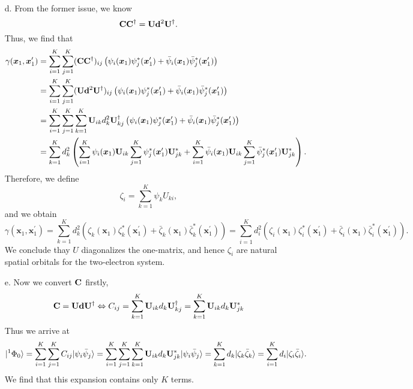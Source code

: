 \documentclass[a4paper]{book}
\newcommand{\C}{{\bf C}}
\newcommand{\U}{{\bf U}}
\begin{document}
\begin{solution}
\begin{enumerate}
	\item[d.] From the former issue, we know
	\[
		\C \C^\dagger = \U {\bf d}^2 \U^\dagger.
	\]
	Thus, we find that
	\begin{align*}
		\gamma( \boldsymbol{x}_1 , \boldsymbol{x}^\prime_1 ) &= \sum_{ i=1 }^K \sum_{ j=1 }^K (\C \C^\dagger)_{ij} \left( \psi_i( \boldsymbol{x}_1 ) \psi^*_j( \boldsymbol{x}^\prime_1 ) + \bar{\psi}_i( \boldsymbol{x}_1 ) \bar{\psi}^*_j( \boldsymbol{x}^\prime_1 ) \right) \\
		&= \sum_{ i=1 }^K \sum_{ j=1 }^K ( \U {\bf d}^2 \U^\dagger )_{ij} \left( \psi_i( \boldsymbol{x}_1 ) \psi^*_j( \boldsymbol{x}^\prime_1 ) + \bar{\psi}_i( \boldsymbol{x}_1 ) \bar{\psi}^*_j( \boldsymbol{x}^\prime_1 ) \right) \\
		&= \sum_{ i=1 }^K \sum_{ j=1 }^K \sum_{ k=1 }^K \U_{ik} d^2_k \U^\dagger_{kj} \left( \psi_i( \boldsymbol{x}_1 ) \psi^*_j( \boldsymbol{x}^\prime_1 ) + \bar{\psi}_i( \boldsymbol{x}_1 ) \bar{\psi}^*_j( \boldsymbol{x}^\prime_1 ) \right) \\
		&= \sum_{ k=1 }^K d^2_k \left( \sum_{ i=1 }^K \psi_i( \boldsymbol{x}_1 ) \U_{ik} \sum_{ j=1 }^K \psi^*_j( \boldsymbol{x}^\prime_1 ) \U^*_{jk} + \sum_{ i=1 }^K \bar{\psi}_i( \boldsymbol{x}_1 ) \U_{ik} \sum_{ j=1 }^K \bar{\psi}^*_j( \boldsymbol{x}^\prime_1 ) \U^*_{jk} \right).
	\end{align*}
	Therefore, we define
	\[
		\zeta_i = \sum_{k=1}^K \psi_k U_{ki},
	\]
	and we obtain
	\begin{equation}
		\gamma( \boldsymbol{x}_1 , \boldsymbol{x}^\prime_1 ) = \sum_{ k=1 }^K d^2_k \left( \zeta_k(\boldsymbol{x}_1) \zeta^*_k( \boldsymbol{x}^\prime_1 ) + \bar{\zeta}_k( \boldsymbol{x}_1 ) \bar{\zeta}^*_k( \boldsymbol{x}^\prime_1 ) \right) = \sum_{ i=1 }^K d^2_i \left( \zeta_i(\boldsymbol{x}_1) \zeta^*_i( \boldsymbol{x}^\prime_1 ) + \bar{\zeta}_i( \boldsymbol{x}_1 ) \bar{\zeta}^*_i( \boldsymbol{x}^\prime_1 ) \right).
	\end{equation}
	We conclude thay $U$ diagonalizes the one-matrix, and hence $\zeta_i$ are natural spatial orbitals for the two-electron system.
	
	\item[e.] Now we convert $\C$ firstly,	
	\[
		\C = \U {\bf d} \U^\dagger \Leftrightarrow C_{ij} = \sum_{k=1}^K \U_{ik} d_{k} \U^\dagger_{kj} = \sum_{k=1}^K \U_{ik} d_{k} \U^*_{jk} 
	\]
	Thus we arrive at
	\begin{equation}
		|{}^{1} \Phi_0 \rangle = \sum_{i=1}^K \sum_{j=1}^K C_{ij} | \psi_i \bar{\psi}_j \rangle = \sum_{i=1}^K \sum_{j=1}^K \sum_{k=1}^K \U_{ik} d_{k} \U^*_{jk} | \psi_i \bar{\psi}_j \rangle = \sum_{k=1}^K d_{k} | \zeta_k \bar{\zeta}_k \rangle = \sum_{i=1}^K d_{i} | \zeta_i \bar{\zeta}_i \rangle.
	\end{equation}
	We find that this expansion contains only $K$ terms.
	
	\end{enumerate}
	
	\end{solution}
	
\end{document}
